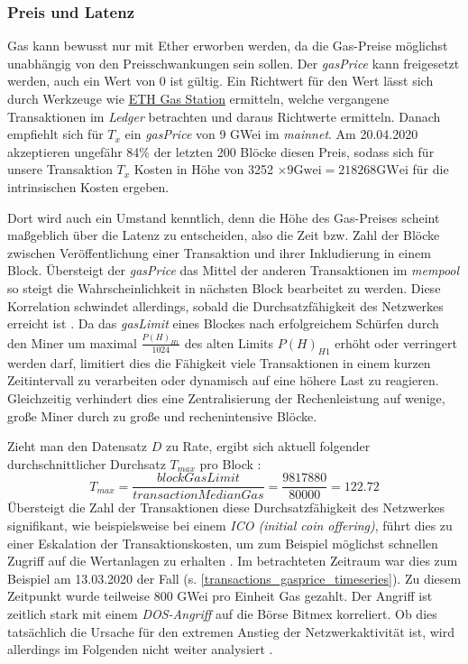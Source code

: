 \documentclass[runningheads]{llncs}
\begin{document}
\subsubsection{Preis und Latenz}
Gas kann bewusst nur mit Ether erworben werden, da die Gas-Preise möglichst unabhängig von den Preisschwankungen sein sollen. Der \textit{gasPrice} kann freigesetzt werden, auch ein Wert von 0 ist gültig. Ein Richtwert für den Wert lässt sich durch Werkzeuge wie \href{https://www.ethgasstation.info/}{ETH Gas Station} ermitteln, welche vergangene Transaktionen im \textit{Ledger} betrachten und daraus Richtwerte ermitteln. Danach empfiehlt sich für $ T_x $ ein \textit{gasPrice} von 9 GWei im \textit{mainnet}. Am 20.04.2020 akzeptieren ungefähr 84\% der letzten 200 Blöcke diesen Preis, sodass sich für unsere Transaktion $ T_x $ Kosten in Höhe von 3252 $ \times 9 \text{Gwei} = 218268 \text{GWei} $ für die intrinsischen Kosten ergeben.

Dort wird auch ein Umstand kenntlich, denn die Höhe des Gas-Preises scheint maßgeblich über die Latenz zu entscheiden, also die Zeit bzw. Zahl der Blöcke zwischen Veröffentlichung einer Transaktion und ihrer Inkludierung in einem Block. Übersteigt der \textit{gasPrice} das Mittel der anderen Transaktionen im \textit{mempool} so steigt die Wahrscheinlichkeit in nächsten Block bearbeitet zu werden. Diese Korrelation schwindet allerdings, sobald die Durchsatzfähigkeit des Netzwerkes erreicht ist \cite[S. 30 f.]{pierro_influence_2019}. Da das \textit{gasLimit} eines Blockes nach erfolgreichem Schürfen durch den Miner um maximal $ \frac{P(H)_{H1}}{1024} $ des alten Limits  $ P(H)_{H1} $ erhöht oder verringert werden darf, limitiert dies die Fähigkeit viele Transaktionen in einem kurzen Zeitintervall zu verarbeiten oder dynamisch auf eine höhere Last zu reagieren. Gleichzeitig  verhindert dies eine Zentralisierung der Rechenleistung auf wenige, große Miner durch zu große und rechenintensive Blöcke.

Zieht man den Datensatz $ D $ zu Rate, ergibt sich aktuell folgender durchschnittlicher Durchsatz $ T_{max} $ pro Block \cite{neemann_appendix_nodate}: 
$$
  T_{max} = \frac{\textit{blockGasLimit}}{\textit{transactionMedianGas}} = \frac{9817880}{80000} = 122.72
$$
Übersteigt die Zahl der  Transaktionen diese Durchsatzfähigkeit des Netzwerkes signifikant, wie beispielsweise bei einem \textit{ICO (initial coin offering)}, führt dies zu einer Eskalation der Transaktionskosten, um zum Beispiel möglichst schnellen Zugriff auf die Wertanlagen zu erhalten \cite[S. 9:6 f.]{m.spain_oasics-tokeneconomics_2019}. Im betrachteten Zeitraum war dies zum Beispiel am 13.03.2020 der Fall (s. \ref{transactions_gasprice_timeseries}). Zu diesem Zeitpunkt wurde teilweise 800 GWei pro Einheit Gas gezahlt. Der Angriff ist zeitlich stark mit einem \textit{DOS-Angriff} auf die Börse Bitmex korreliert. Ob dies tatsächlich die Ursache für den extremen Anstieg der Netzwerkaktivität ist, wird allerdings im Folgenden nicht weiter analysiert \cite{bitmex_ddos_nodate}.
\end{document}
